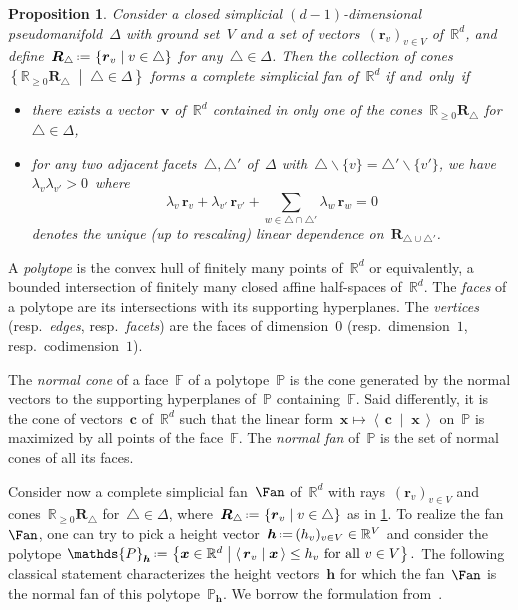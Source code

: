 \documentclass{amsart}
\newtheorem{proposition}[theorem]{Proposition}
\theoremstyle{definition}
\newcommand{\R}{\mathbb{R}} %
\renewcommand{\b}[1]{{\boldsymbol{#1}}} %
\newcommand{\set}[2]{\left\{ #1 \;\middle|\; #2 \right\}} %
\newcommand{\ssm}{\smallsetminus} %
\newcommand{\dotprod}[2]{\left\langle \, #1 \; \middle| \; #2 \, \right\rangle} %
\newcommand{\eqdef}{\mbox{\,\raisebox{0.2ex}{\scriptsize\ensuremath{\mathrm:}}\ensuremath{=}\,}} %
\newcommand{\darkblue}{\color{darkblue}} %
\newcommand{\defn}[1]{\textsl{\darkblue #1}} %
\newcommand{\polytope}[1]{\mathds{#1}} %
\begin{document}
\begin{proposition}
\label{prop:characterizationFan}
Consider a closed simplicial $(d-1)$-dimensional pseudomanifold~$\Delta$ with ground set~$V$ and a set of vectors~$(\b{r}_v)_{v \in V}$ of~$\R^d$, and define~$\b{R}_\triangle \eqdef \set{\b{r}_v}{v \in \triangle}$ for any~$\triangle \in \Delta$.
Then the collection of cones~$\set{\R_{\ge 0}\b{R}_\triangle}{\triangle \in \Delta}$ forms a complete simplicial fan of~$\R^d$ if and~only~if
\begin{itemize}
\item there exists a vector~$\b{v}$ of~$\R^d$ contained in only one of the cones~$\R_{\ge 0}\b{R}_\triangle$ for~$\triangle \in \Delta$,
\item for any two adjacent facets~$\triangle, \triangle'$ of~$\Delta$ with~$\triangle \ssm \{v\} = \triangle' \ssm \{v'\}$, we have~$\lambda_v \lambda_{v'} > 0$~where
\[
\lambda_v \, \b{r}_v + \lambda_{v'} \, \b{r}_{v'} + \sum_{w \in \triangle \cap \triangle'} \lambda_w \, \b{r}_w = 0
\]
denotes the unique (up to rescaling) linear dependence on~$\b{R}_{\triangle \cup \triangle'}$.
\end{itemize}
\end{proposition}

A \defn{polytope} is the convex hull of finitely many points of~$\R^d$ or equivalently, a bounded intersection of finitely many closed affine half-spaces of~$\R^d$.
The \defn{faces} of a polytope are its intersections with its supporting hyperplanes.
The \defn{vertices} (resp.~\defn{edges}, resp.~\defn{facets}) are the faces of dimension~$0$ (resp.~dimension~$1$, resp.~codimension~$1$).

The \defn{normal cone} of a face~$\polytope{F}$ of a polytope~$\polytope{P}$ is the cone generated by the normal vectors to the supporting hyperplanes of~$\polytope{P}$ containing~$\polytope{F}$.
Said differently, it is the cone of vectors~$\b{c}$ of~$\R^d$ such that the linear form~$\b{x} \mapsto \dotprod{\b{c}}{\b{x}}$ on~$\polytope{P}$ is maximized by all points of the face~$\polytope{F}$.
The \defn{normal fan} of~$\polytope{P}$ is the set of normal cones of all its faces.

Consider now a complete simplicial fan~$\Fan$ of~$\R^d$ with rays~$(\b{r}_v)_{v \in V}$ and cones~$\R_{\ge 0} \b{R}_\triangle$ for~${\triangle \in \Delta}$, where~$\b{R}_\triangle \eqdef \set{\b{r}_v}{v \in \triangle}$ as in \cref{prop:characterizationFan}.
To realize the fan~$\Fan$, one can try to pick a height vector~$\b{h} \eqdef (h_v)_{v \in V} \in \R^V$ and consider the polytope
\(
\polytope{P}_{\b{h}} \eqdef \set{\b{x} \in \R^d}{\dotprod{\b{r}_v}{\b{x}} \le h_v \text{ for all } v \in V}.
\)
The following classical statement characterizes the height vectors~$\b{h}$ for which the fan~$\Fan$ is the normal fan of this polytope~$\polytope{P}_{\b{h}}$.
We borrow the formulation from~\cite[Lem.~2.1]{ChapotonFominZelevinsky}.
\end{document}
